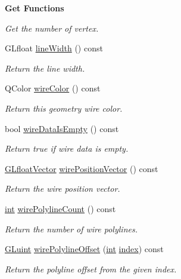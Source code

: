 \begin{Indent}{\bf Get Functions}
\begin{DoxyCompactItemize}
\begin{DoxyCompactList}\small\item\em Get the number of vertex. \end{DoxyCompactList}\item 
G\-Lfloat \hyperlink{class_g_l_c___geometry_a04b010db25b8ffa3f1837cf5859644ec}{line\-Width} () const 
\begin{DoxyCompactList}\small\item\em Return the line width. \end{DoxyCompactList}\item 
Q\-Color \hyperlink{class_g_l_c___geometry_affd65511cde7dd734e5fdd673e561236}{wire\-Color} () const 
\begin{DoxyCompactList}\small\item\em Return this geometry wire color. \end{DoxyCompactList}\item 
bool \hyperlink{class_g_l_c___geometry_a18d8cf1479f2192b9a69fb52bcdee8c6}{wire\-Data\-Is\-Empty} () const 
\begin{DoxyCompactList}\small\item\em Return true if wire data is empty. \end{DoxyCompactList}\item 
\hyperlink{glc__global_8h_a9f3f0b00cd127b066c9931b9c257a046}{G\-Lfloat\-Vector} \hyperlink{class_g_l_c___geometry_a0f460a577e3b5599b2be5a51d45c7c30}{wire\-Position\-Vector} () const 
\begin{DoxyCompactList}\small\item\em Return the wire position vector. \end{DoxyCompactList}\item 
\hyperlink{ioapi_8h_a787fa3cf048117ba7123753c1e74fcd6}{int} \hyperlink{class_g_l_c___geometry_aa35124f7bf74411a9786b86529fa3e9a}{wire\-Polyline\-Count} () const 
\begin{DoxyCompactList}\small\item\em Return the number of wire polylines. \end{DoxyCompactList}\item 
\hyperlink{glext_8h_a2f0c8cd5c21f9fcbd931c3f48bc90dfc}{G\-Luint} \hyperlink{class_g_l_c___geometry_a4de9cff7aeb3c91e411400ccf89bb050}{wire\-Polyline\-Offset} (\hyperlink{ioapi_8h_a787fa3cf048117ba7123753c1e74fcd6}{int} \hyperlink{glext_8h_ab47dd9958bcadea08866b42bf358e95e}{index}) const 
\begin{DoxyCompactList}\small\item\em Return the polyline offset from the given index. \end{DoxyCompactList}\item 

\end{DoxyCompactItemize}
\end{Indent}
